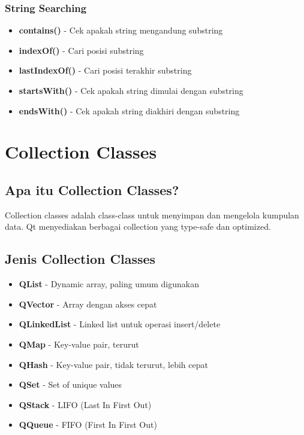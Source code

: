 \subsubsection{String Searching}

\begin{itemize}
\item \textbf{contains()} - Cek apakah string mengandung substring
\item \textbf{indexOf()} - Cari posisi substring
\item \textbf{lastIndexOf()} - Cari posisi terakhir substring
\item \textbf{startsWith()} - Cek apakah string dimulai dengan substring
\item \textbf{endsWith()} - Cek apakah string diakhiri dengan substring
\end{itemize}

\section{Collection Classes}

\subsection{Apa itu Collection Classes?}

Collection classes adalah class-class untuk menyimpan dan mengelola kumpulan data. Qt menyediakan berbagai collection yang type-safe dan optimized.

\subsection{Jenis Collection Classes}

\begin{itemize}
\item \textbf{QList} - Dynamic array, paling umum digunakan
\item \textbf{QVector} - Array dengan akses cepat
\item \textbf{QLinkedList} - Linked list untuk operasi insert/delete
\item \textbf{QMap} - Key-value pair, terurut
\item \textbf{QHash} - Key-value pair, tidak terurut, lebih cepat
\item \textbf{QSet} - Set of unique values
\item \textbf{QStack} - LIFO (Last In First Out)
\item \textbf{QQueue} - FIFO (First In First Out)
\end{itemize}

